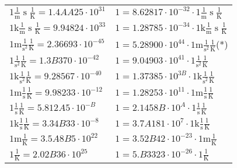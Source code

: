 \begin{center}
\begin{longtable}{l l}
{\color{black}$1 \bm{\mathrm{ }}\frac1{\operatorname{m}}{\operatorname{s}}{}\frac1{\operatorname{K}} = 1.4AA25\cdot10^{31} $}   & {\color{black}$ 1 = 8.62817\cdot10^{-32} \cdot 1 \bm{\mathrm{ }}\frac1{\operatorname{m}}{\operatorname{s}}{}\frac1{\operatorname{K}}$}  \\
{\color{gray}$1 \bm{\mathrm{ k}}\frac1{\operatorname{m}}{\operatorname{s}}{}\frac1{\operatorname{K}} = 9.94824\cdot10^{33} $}   & {\color{gray}$ 1 = 1.28785\cdot10^{-34} \cdot 1 \bm{\mathrm{ k}}\frac1{\operatorname{m}}{\operatorname{s}}{}\frac1{\operatorname{K}}$}  \\
{\color{gray}$1 \bm{\mathrm{ m}}{}\frac1{\operatorname{s}^2}{}\frac1{\operatorname{K}} = 2.36693\cdot10^{-45} $}   & {\color{gray}$ 1 = 5.28900\cdot10^{44} \cdot 1 \bm{\mathrm{ m}}{}\frac1{\operatorname{s}^2}{}\frac1{\operatorname{K}}$}\quad(*)\\
{\color{black}$1 \bm{\mathrm{ }}{}\frac1{\operatorname{s}^2}{}\frac1{\operatorname{K}} = 1.3B370\cdot10^{-42} $}   & {\color{black}$ 1 = 9.04903\cdot10^{41} \cdot 1 \bm{\mathrm{ }}{}\frac1{\operatorname{s}^2}{}\frac1{\operatorname{K}}$}  \\
{\color{gray}$1 \bm{\mathrm{ k}}{}\frac1{\operatorname{s}^2}{}\frac1{\operatorname{K}} = 9.28567\cdot10^{-40} $}   & {\color{gray}$ 1 = 1.37385\cdot10^{3B} \cdot 1 \bm{\mathrm{ k}}{}\frac1{\operatorname{s}^2}{}\frac1{\operatorname{K}}$}  \\
{\color{gray}$1 \bm{\mathrm{ m}}{}\frac1{\operatorname{s}}{}\frac1{\operatorname{K}} = 9.98233\cdot10^{-12} $}   & {\color{gray}$ 1 = 1.28253\cdot10^{11} \cdot 1 \bm{\mathrm{ m}}{}\frac1{\operatorname{s}}{}\frac1{\operatorname{K}}$}  \\
{\color{black}$1 \bm{\mathrm{ }}{}\frac1{\operatorname{s}}{}\frac1{\operatorname{K}} = 5.812A5\cdot10^{-B} $}   & {\color{black}$ 1 = 2.1458B\cdot10^{A} \cdot 1 \bm{\mathrm{ }}{}\frac1{\operatorname{s}}{}\frac1{\operatorname{K}}$}  \\
{\color{gray}$1 \bm{\mathrm{ k}}{}\frac1{\operatorname{s}}{}\frac1{\operatorname{K}} = 3.34B33\cdot10^{-8} $}   & {\color{gray}$ 1 = 3.7A181\cdot10^{7} \cdot 1 \bm{\mathrm{ k}}{}\frac1{\operatorname{s}}{}\frac1{\operatorname{K}}$}  \\
{\color{gray}$1 \bm{\mathrm{ m}}{}{}{}\frac1{\operatorname{K}} = 3.5A8B5\cdot10^{22} $}   & {\color{gray}$ 1 = 3.52B42\cdot10^{-23} \cdot 1 \bm{\mathrm{ m}}{}{}{}\frac1{\operatorname{K}}$}  \\
{\color{black}$1 \bm{\mathrm{ }}{}{}{}\frac1{\operatorname{K}} = 2.02B36\cdot10^{25} $}   & {\color{black}$ 1 = 5.B3323\cdot10^{-26} \cdot 1 \bm{\mathrm{ }}{}{}{}\frac1{\operatorname{K}}$}  \\

\end{longtable}
\end{center}
